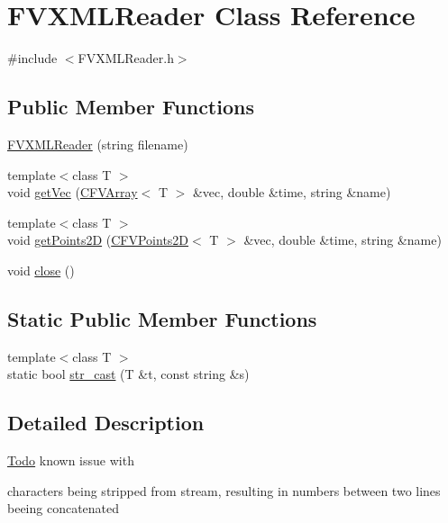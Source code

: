 \hypertarget{classFVL_1_1FVXMLReader}{
\section{FVXMLReader Class Reference}
\label{d2/d9a/classFVL_1_1FVXMLReader}
}


{\ttfamily \#include $<$FVXMLReader.h$>$}

\subsection*{Public Member Functions}
\begin{DoxyCompactItemize}
\item 
\hyperlink{classFVL_1_1FVXMLReader_ad64566c91703b6facc7e8abb99bd592f}{FVXMLReader} (string filename)
\item 
{\footnotesize template$<$class T $>$ }\\void \hyperlink{classFVL_1_1FVXMLReader_a942ee6c1f6d520aa22106044984d8677}{getVec} (\hyperlink{classFVL_1_1CFVArray}{CFVArray}$<$ T $>$ \&vec, double \&time, string \&name)
\item 
{\footnotesize template$<$class T $>$ }\\void \hyperlink{classFVL_1_1FVXMLReader_a40dd2b3c9977316e8f3be7ea51db4d0c}{getPoints2D} (\hyperlink{classFVL_1_1CFVPoints2D}{CFVPoints2D}$<$ T $>$ \&vec, double \&time, string \&name)
\item 
void \hyperlink{classFVL_1_1FVXMLReader_a5ae591df94fc66ccb85cbb6565368bca}{close} ()
\end{DoxyCompactItemize}
\subsection*{Static Public Member Functions}
\begin{DoxyCompactItemize}
\item 
{\footnotesize template$<$class T $>$ }\\static bool \hyperlink{classFVL_1_1FVXMLReader_ac0466143984e67ba108883aa9d569eaa}{str\_\-cast} (T \&t, const string \&s)
\end{DoxyCompactItemize}


\subsection{Detailed Description}
\begin{Desc}
\item[\hyperlink{todo__todo000013}{Todo}]known issue with \par
 characters being stripped from stream, resulting in numbers between two lines beeing concatenated \end{Desc}


